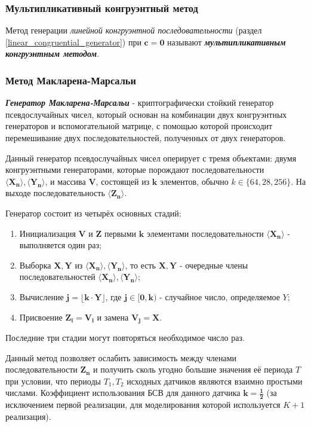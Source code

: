 \subsubsection{Мультипликативный конгруэнтный метод}
Метод генерации \textit{линейной конгруэнтной последовательности} (раздел \ref{linear_congruential_generator}) при $\mathbf{c = 0}$ называют \textbf{\textit{мультипликативным конгруэнтным методом}}.

\subsubsection{Метод Макларена-Марсальи}
\textbf{\textit{Генератор Макларена-Марсальи}} - криптографически стойкий генератор псевдослучайных чисел, который основан на комбинации двух конгруэнтных генераторов и вспомогательной матрице, с помощью которой происходит перемешивание двух последовательностей, полученных от двух генераторов.

Данный генератор псевдослучайных чисел оперирует с тремя объектами: двумя конгруэнтными генераторами, которые порождают последовательности $\mathbf{\langle X_n \rangle, \langle Y_n \rangle}$, и массива $\mathbf{V}$, состоящей из $\mathbf{k}$ элементов, обычно $k \in \lbrace 64, 28, 256 \rbrace$. На выходе последовательность $\mathbf{\langle Z_n \rangle}$.

Генератор состоит из четырёх основных стадий:
\begin{enumerate}
	\item Инициализация $\mathbf{V}$ и $\mathbf{Z}$ первыми $\mathbf{k}$ элементами последовательности $\mathbf{\langle X_n \rangle}$ - выполняется один раз;
	\item Выборка $\mathbf{X, Y}$ из $\mathbf{\langle X_n \rangle, \langle Y_n \rangle}$, то есть $\mathbf{X, Y}$ - очередные члены последовательностей $\mathbf{\langle X_n \rangle, \langle Y_n \rangle}$;
	\item Вычисление $\mathbf{j = \lfloor k \cdot Y \rfloor}$, где $\mathbf{j \in [0,k)}$ - случайное число, определяемое $Y$;
	\item Присвоение $\mathbf{Z_i=V_i}$ и замена $\mathbf{V_j = X}$.
\end{enumerate}

Последние три стадии могут повторяться необходимое число раз.

Данный метод позволяет ослабить зависимость между членами последовательности $\mathbf{Z_n}$ и получить сколь угодно большие значения её периода $T$ при условии, что периоды $T_1, T_2$ исходных датчиков являются взаимно простыми числами. Коэффициент использования БСВ для данного датчика $\mathbf{k=\frac{1}{2}}$ (за исключением первой реализации, для моделирования которой используется $K+1$ реализация).

